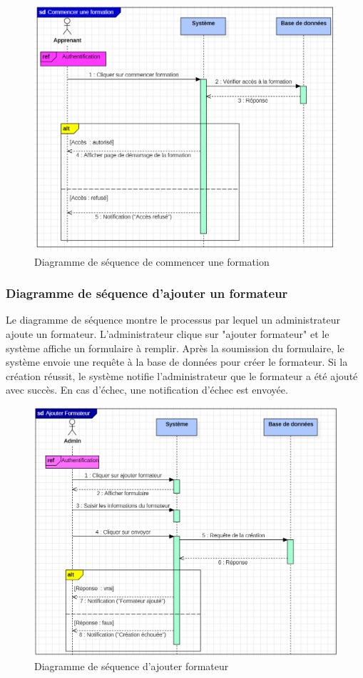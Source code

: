 \begin{figure}[H]
    \centering
    \includegraphics[width=19cm]{Figures/diagrammeDeSequenceCommencerCours.PNG}
    \caption{Diagramme de séquence de commencer une formation}
\end{figure}

\subsubsection{Diagramme de séquence d'ajouter un formateur}

Le diagramme de séquence montre le processus par lequel un administrateur ajoute un formateur. L'administrateur clique sur "ajouter formateur" et le système affiche un formulaire à remplir. Après la soumission du formulaire, le système envoie une requête à la base de données pour créer le formateur. Si la création réussit, le système notifie l'administrateur que le formateur a été ajouté avec succès. En cas d'échec, une notification d'échec est envoyée.

\begin{figure}[H]
    \centering
    \includegraphics[width=19cm]{Figures/diagrammeDeSequenceAddAuthor.PNG}
    \caption{Diagramme de séquence d'ajouter formateur}
\end{figure}

